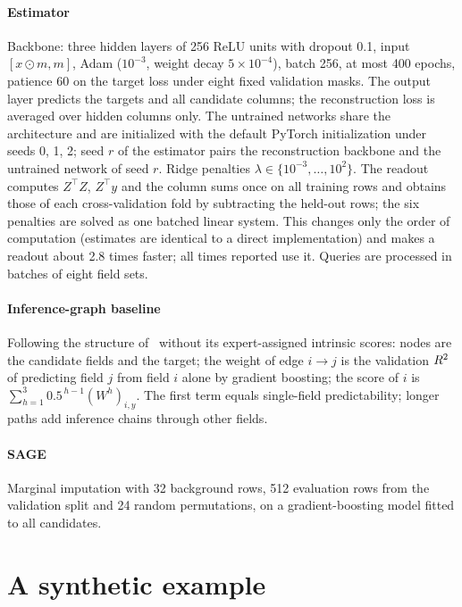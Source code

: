 \paragraph{Estimator} Backbone: three hidden layers of 256 ReLU units with dropout 0.1, input
$[x\odot m, m]$, Adam ($10^{-3}$, weight decay $5\times10^{-4}$), batch 256, at most 400 epochs,
patience 60 on the target loss under eight fixed validation masks. The output layer predicts the targets and all
candidate columns; the reconstruction loss is averaged over hidden columns only. The untrained networks share the
architecture and are initialized with the default PyTorch initialization under seeds 0, 1, 2; seed $r$ of the estimator pairs
the reconstruction backbone and the untrained network of seed $r$. Ridge penalties $\lambda\in\{10^{-3},\dots,10^{2}\}$.
The readout computes $Z^{\top}Z$, $Z^{\top}y$ and the column sums once on all training rows and obtains those of each
cross-validation fold by subtracting the held-out rows; the six penalties are solved as one batched linear system. This
changes only the order of computation (estimates are identical to a direct implementation) and makes a readout about
2.8 times faster; all times reported use it. Queries are processed in batches of eight field sets.

\paragraph{Inference-graph baseline} Following the structure of~\cite{hu2026ignn} without its
expert-assigned intrinsic scores: nodes are the candidate fields and the target; the weight of edge
$i\to j$ is the validation $R^{2}$ of predicting field $j$ from field $i$ alone by gradient boosting; the
score of $i$ is $\sum_{h=1}^{3}0.5^{\,h-1}(W^{h})_{i,y}$. The first term equals single-field
predictability; longer paths add inference chains through other fields.

\paragraph{SAGE} Marginal imputation with 32 background rows, 512 evaluation rows from the
validation split and 24 random permutations, on a gradient-boosting model fitted to all candidates.



\section{A synthetic example}\label{app:toy}

